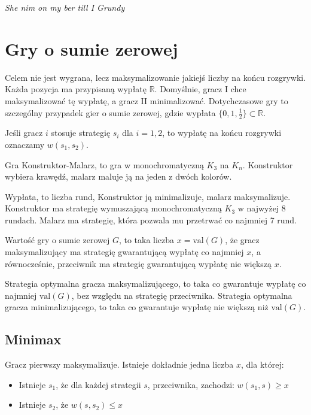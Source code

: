 \documentclass{../notatki}
\begin{document}
\textit{\tiny She nim on my ber till I Grundy}

\section{Gry o sumie zerowej}

Celem nie jest wygrana, lecz maksymalizowanie jakiejś liczby na końcu
rozgrywki. Każda pozycja ma przypisaną wypłatę $\mathbb{R}$.
Domyślnie, gracz I chce maksymalizować tę wypłatę, a gracz II minimalizować.
Dotychczasowe gry to szczególny przypadek gier o sumie zerowej, gdzie wypłata
$\{0, 1, \frac{1}{2}\} \subset \mathbb{R}$.

Jeśli gracz $i$ stosuje strategię $s_i$ dla $i = 1,2$, to wypłatę na
końcu rozgrywki oznaczamy $w(s_1, s_2)$.

\begin{examplebox}
  Gra Konstruktor-Malarz, to gra w monochromatyczną $K_3$ na $K_n$.
  Konstruktor wybiera krawędź, malarz maluje ją na jeden z dwóch kolorów.

  Wypłata, to liczba rund, Konstruktor ją minimalizuje, malarz
  maksymalizuje. Konstruktor ma strategię wymuszającą
  monochromatyczną $K_3$ w najwyżej 8 rundach.
  Malarz ma strategię, która pozwala mu przetrwać co najmniej 7 rund.
\end{examplebox}

Wartość gry o sumie zerowej $G$, to taka liczba $x = \textrm{val}(G)$, że gracz
maksymalizujący ma strategię gwarantującą wypłatę co najmniej $x$, a
równocześnie, przeciwnik ma strategię gwarantującą wypłatę nie większą $x$.

Strategia optymalna gracza maksymalizującego, to taka co gwarantuje
wypłatę co najmniej $\textrm{val}(G)$, bez względu na strategię
przeciwnika. Strategia optymalna gracza minimalizującego, to taka co
gwarantuje wypłatę nie większą niż $\textrm{val}(G)$.

\subsection{Minimax}

Gracz pierwszy maksymalizuje. Istnieje dokładnie jedna liczba $x$, dla której:
\begin{itemize}
  \item Istnieje $s_1$, że dla każdej strategii $s$, przeciwnika,
    zachodzi: $w(s_1, s) \geq x$
  \item Istnieje $s_2$, że $w(s, s_2) \leq x$
\end{itemize}
\end{document}
